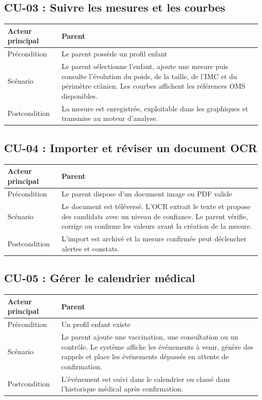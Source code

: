 \subsection{CU-03 : Suivre les mesures et les courbes}
\begin{tabularx}{\textwidth}{|l|X|}
\hline
Acteur principal & Parent \\
\hline
Précondition & Le parent possède un profil enfant \\
\hline
Scénario & Le parent sélectionne l'enfant, ajoute une mesure puis consulte l'évolution du poids, de la taille, de l'IMC et du périmètre crânien. Les courbes affichent les références OMS disponibles. \\
\hline
Postcondition & La mesure est enregistrée, exploitable dans les graphiques et transmise au moteur d'analyse. \\
\hline
\end{tabularx}

\subsection{CU-04 : Importer et réviser un document OCR}
\begin{tabularx}{\textwidth}{|l|X|}
\hline
Acteur principal & Parent \\
\hline
Précondition & Le parent dispose d'un document image ou PDF valide \\
\hline
Scénario & Le document est téléversé. L'OCR extrait le texte et propose des candidats avec un niveau de confiance. Le parent vérifie, corrige ou confirme les valeurs avant la création de la mesure. \\
\hline
Postcondition & L'import est archivé et la mesure confirmée peut déclencher alertes et constats. \\
\hline
\end{tabularx}

\subsection{CU-05 : Gérer le calendrier médical}
\begin{tabularx}{\textwidth}{|l|X|}
\hline
Acteur principal & Parent \\
\hline
Précondition & Un profil enfant existe \\
\hline
Scénario & Le parent ajoute une vaccination, une consultation ou un contrôle. Le système affiche les événements à venir, génère des rappels et place les événements dépassés en attente de confirmation. \\
\hline
Postcondition & L'événement est suivi dans le calendrier ou classé dans l'historique médical après confirmation. \\
\hline
\end{tabularx}

